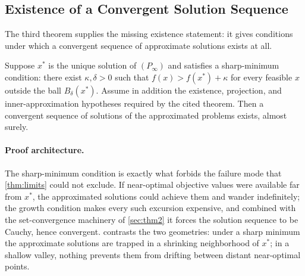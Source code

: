 \subsection{Existence of a Convergent Solution Sequence}
\label{sec:thm3}

The third theorem supplies the missing existence statement: it
gives conditions under which a convergent sequence of approximate
solutions exists at all.

\begin{theorem}
\label{thm:existence}
Suppose $x^*$ is the unique solution of $(P_\infty)$ and satisfies a
sharp-minimum condition: there exist $\kappa, \delta > 0$
such that $f(x) > f(x^*) + \kappa$ for every feasible $x$
outside the ball $B_\delta(x^*)$. Assume in addition the existence,
projection, and inner-approximation hypotheses required by the cited
theorem. Then a convergent sequence of
solutions of the approximated problems exists, almost surely.
\end{theorem}

\paragraph*{Proof architecture.} The sharp-minimum condition is exactly what
forbids the failure mode that \cref{thm:limits} could not exclude. If
near-optimal objective values were available far from $x^*$, the
approximated solutions could achieve them and wander indefinitely;
the growth condition makes every such excursion expensive, and combined
with the set-convergence machinery of \cref{sec:thm2} it forces the
solution sequence to be Cauchy, hence convergent.
 contrasts the two geometries: under a sharp minimum
the approximate solutions are trapped in a shrinking neighborhood of
$x^*$; in a shallow valley, nothing prevents them from drifting between
distant near-optimal points.

